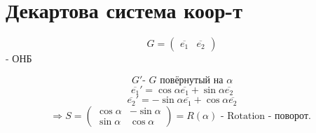 \section{Декартова система коор-т}

\[
    G = \begin{pmatrix}\overline{e_1} & \overline{e_2} \end{pmatrix}
\] - ОНБ 

\[
    G' \text{- $G$ повёрнутый на $\alpha$}
\] 
\[
    \overline{e_1}' = \cos \alpha \overline{e_1} + \sin \alpha \overline{e_2}
\] 
\[
    \overline{e_2}' = -\sin\alpha \overline{e_1} + \cos \alpha \overline{e_2}
\] 
\[
    \Rightarrow S = \begin{pmatrix}\cos \alpha & -\sin \alpha \\ \sin \alpha & \cos \alpha \end{pmatrix} = R(\alpha) \text{ - Rotation - поворот. }
\] 

